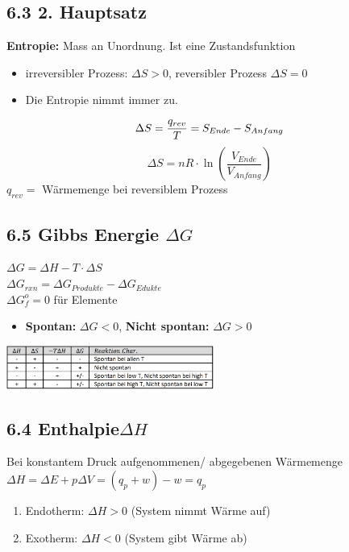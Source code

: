\begin{multicols*}{4}
\subsection{6.3 2. Hauptsatz}{
\textbf{Entropie:} Mass an Unordnung. Ist eine Zustandsfunktion
\begin{itemize}[noitemsep, leftmargin=*]
    \item irreversibler Prozess:  $\Delta S > 0$, reversibler Prozess $\Delta S = 0$
    \item Die Entropie nimmt immer zu.
\end{itemize}
\begin{equation*}
    \Delta S = \frac{q_{rev}}{T}=S_{Ende}-S_{Anfang}\\
\end{equation*}
\begin{equation*}
    \Delta S = nR\cdot \ln\left(\frac{V_{Ende}}{V_{Anfang}}\right)
\end{equation*}
\quad $q_{rev}=$ Wärmemenge bei reversiblem Prozess
}

\subsection{6.5 Gibbs Energie $\Delta G$}{
    $\Delta G = \Delta H -T\cdot\Delta S$ \\
    $\Delta G_{rxn} = \Delta G_{Produkte} - \Delta G_{Edukte}$\\
    $\Delta {G^o_f} = 0$ für Elemente
    \begin{itemize}[noitemsep, leftmargin=*]
        \item \textbf{Spontan:} $\Delta G < 0$,  
        \textbf{Nicht spontan:} $\Delta G > 0$
    \end{itemize}
    \includegraphics[width=68mm]{Bilder/Gibs.png}
}

\subsection{6.4 Enthalpie$\Delta H$}{
Bei konstantem Druck aufgenommenen/ abgegebenen Wärmemenge\\
$\Delta H = \Delta E + p\Delta V = (q_p+w)-w=q_p$
\begin{enumerate}[noitemsep,leftmargin=*]
    \item Endotherm: $\Delta H > 0$ (System nimmt Wärme auf)
    \item Exotherm: $\Delta H < 0$ (System gibt Wärme ab)
\end{enumerate}

}
\end{multicols*}
